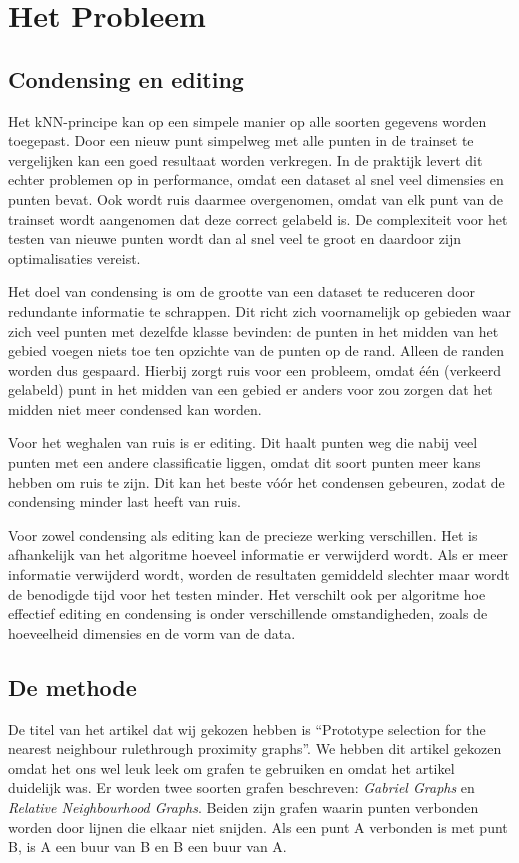 \documentclass{article}
\begin{document}
\section{Het Probleem}
\subsection{Condensing en editing}

Het kNN-principe kan op een simpele manier op alle soorten gegevens worden toegepast. Door een nieuw punt simpelweg met alle punten in de trainset te vergelijken kan een goed resultaat worden verkregen. In de praktijk levert dit echter problemen op in performance, omdat een dataset al snel veel dimensies en punten bevat. Ook wordt ruis daarmee overgenomen, omdat van elk punt van de trainset wordt aangenomen dat deze correct gelabeld is. De complexiteit voor het testen van nieuwe punten wordt dan al snel veel te groot en daardoor zijn optimalisaties vereist.

Het doel van condensing is om de grootte van een dataset te reduceren door redundante informatie te schrappen. Dit richt zich voornamelijk op gebieden waar zich veel punten met dezelfde klasse bevinden: de punten in het midden van het gebied voegen niets toe ten opzichte van de punten op de rand. Alleen de randen worden dus gespaard. Hierbij zorgt ruis voor een probleem, omdat \'{e}\'{e}n (verkeerd gelabeld) punt in het midden van een gebied er anders voor zou zorgen dat het midden niet meer condensed kan worden.
	
Voor het weghalen van ruis is er editing. Dit haalt punten weg die nabij veel punten met een andere classificatie liggen, omdat dit soort punten meer kans hebben om ruis te zijn. Dit kan het beste v\'{o}\'{o}r het condensen gebeuren, zodat de condensing minder last heeft van ruis.
	
Voor zowel condensing als editing kan de precieze werking verschillen. Het is afhankelijk van het algoritme hoeveel informatie er verwijderd wordt. Als er meer informatie verwijderd wordt, worden de resultaten gemiddeld slechter maar wordt de benodigde tijd voor het testen minder. Het verschilt ook per algoritme hoe effectief editing en condensing is onder verschillende omstandigheden, zoals de hoeveelheid dimensies en de vorm van de data.

\subsection{De methode}
De titel van het artikel dat wij gekozen hebben is ``Prototype selection for the nearest neighbour rulethrough proximity graphs''. We hebben dit artikel gekozen omdat het ons wel leuk leek om grafen te gebruiken en omdat het artikel duidelijk was. Er worden twee soorten grafen beschreven: \emph{Gabriel Graphs} en \emph{Relative Neighbourhood Graphs}. Beiden zijn grafen waarin punten verbonden worden door lijnen die elkaar niet snijden. Als een punt A verbonden is met punt B, is A een buur van B en B een buur van A.
\end{document}
